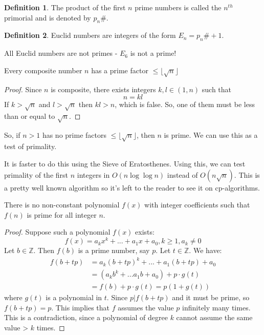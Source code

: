 \documentclass[12pt,letterpaper]{book}
\theoremstyle{definition}
\newtheorem{definition}{Definition} %
\newcommand{\Z}{\mathbb{Z}}
\begin{document}
\begin{definition}
  The product of the first $n$ prime numbers is called the $n^{th}$ primorial and is denoted by $p_n\#$.
\end{definition}

\begin{definition}
  Euclid numbers are integers of the form $E_n = p_n\# +1$.
\end{definition}

All Euclid numbers are not primes - $E_6$ is not a prime!

\begin{theorem}
  Every composite number $n$ has a prime factor $\leq \lfloor \sqrt{n} \rfloor$
\end{theorem}

\begin{proof}
  Since $n$ is composite, there exists integers $k,l \in (1,n)$   such that
  \[n = kl\]
  If $k > \sqrt{n}$ and $l > \sqrt{n}$ then $kl > n$, which is false. So, one of them must be less than or equal to $\sqrt{n}$.
\end{proof}

So, if $n > 1$ has no prime factors $\leq \lfloor \sqrt{n} \rfloor$, then $n$ is prime. We can use this as a test of primality.

It is faster to do this using the Sieve of Eratosthenes. Using this, we can test primality of the first $n$ integers in $O(n \log{\log{n}})$ instead of $O(n\sqrt{n})$. This is a pretty well known algorithm so it's left to the reader to see it on cp-algorithms.

\begin{theorem}
  There is no non-constant polynomial $f(x)$ with integer coefficients such that $f(n)$ is prime for all integer $n$.
\end{theorem}

\begin{proof}
  Suppose such a polynomial $f(x)$ exists:
  \[f(x) = a_kx^k + ... + a_1x + a_0, k \geq 1, a_k \neq 0\]
  Let $b \in \Z$. Then $f(b)$ is a prime number, say $p$. Let $t \in \Z$. We have:
  \begin{align*}
    f(b+tp) &= a_k(b+tp)^k + ... + a_1(b+tp) + a_0 \\
            &= (a_kb^k + ... a_1b + a_0) + p \cdot g(t) \\
            &= f(b) + p \cdot g(t) = p(1+g(t))
  \end{align*}
  where $g(t)$ is a polynomial in $t$. Since $p | f(b+tp)$ and it must be prime, so $f(b+tp) = p$. This implies that $f$ assumes the value $p$ infinitely many times. This is a contradiction, since a polynomial of degree $k$ cannot assume the same value > $k$ times.
\end{proof}
\end{document}
